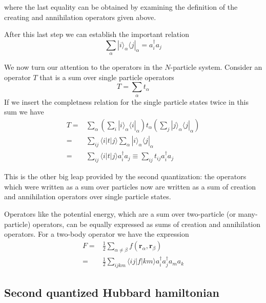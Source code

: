 \documentclass[11pt,letter]{article}
\newcommand{\bv}[1]{\ensuremath{\bm{#1}}}
\begin{document}
where the last equality can be obtained by examining the definition of the
creating and annihilation operators given above. 

After this last step we can establish the important relation
\begin{equation}
   \sum_{\alpha} |i\rangle_{\alpha} \langle j | _{\alpha} = 
     a_{i}^{\dagger} a_{j} 
\end{equation}

We now turn our attention to the operators in the $N$-particle system.
Consider an operator $T$ that is a sum over single particle operators
\begin{equation}
  T = \sum_{\alpha} t_{\alpha}
\end{equation}  
If we insert the completness relation for the single particle states twice in
this sum we have \begin{equation}
\begin{split}
  T = & \sum_{\alpha} \left( \sum_{i} |i\rangle_{\alpha}\langle i |_{\alpha} \right)
        t_{\alpha} \left( \sum_{j} |j\rangle_{\alpha}\langle j |_{\alpha} \right) \\
    = & \sum_{ij}   \langle i | t | j \rangle  \sum_{\alpha} |i\rangle_{\alpha} \langle j |_{\alpha} \\ 
    = & \sum_{ij}   \langle i | t | j \rangle a_{i}^{\dagger} a_{j} \equiv \sum_{ij} t_{ij}   a_{i}^{\dagger} a_{j} 
\end{split}  
\end{equation}

This is the other big leap provided by the second quantization:  the operators
which were written as a sum over particles now are written as a sum of creation
and annihilation operators over single particle states.   

Operators like the potential energy, which are a sum over two-particle (or
many-particle) operators,  can be equally expressed as sums of creation and
annihilation operators.  For a two-body operator we have the expression
\begin{equation}
\begin{split}
F = & \frac{1}{2} \sum_{\alpha\neq\beta} f(\bv{r}_{\alpha}, \bv{r}_{\beta} )  \\
  = & \frac{1}{2} \sum_{ijkm} \langle ij | f | km \rangle a_{i}^{\dagger} a_{j}^{\dagger} a_{m} a_{k} 
\end{split}
\end{equation}

\subsection{Second quantized Hubbard hamiltonian}
\end{document}
